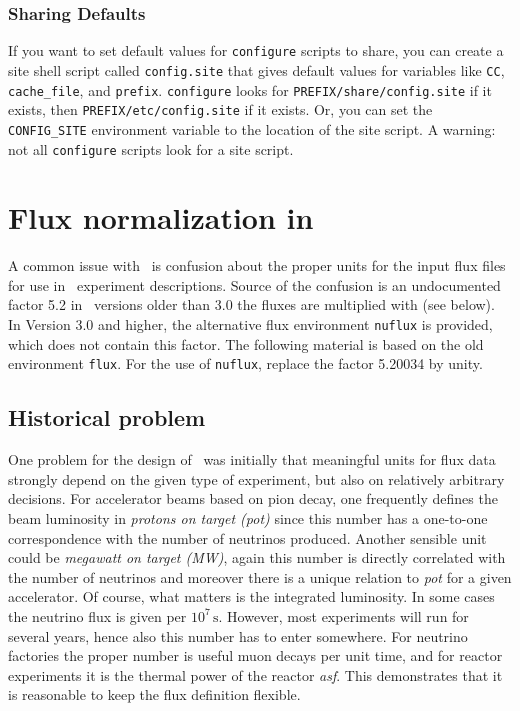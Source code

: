 \begin{appendix}
\subsection*{Sharing Defaults}
   If you want to set default values for \verb+configure+ scripts to share,
you can create a site shell script called \verb+config.site+ that gives
default values for variables like \verb+CC+,  \verb+cache_file+, and 
\verb+prefix+.
\verb+configure+ looks for \verb+PREFIX/share/config.site+ if it exists, then
\verb+PREFIX/etc/config.site+ if it exists.  Or, you can set the
\verb+CONFIG_SITE+ environment variable to the location of the site script.
A warning: not all \verb+configure+ scripts look for a site script.





\chapter{Flux normalization in \GLOBES }
\label{app:flux}

A common issue with \GLOBES\ is confusion about the proper units for
the input flux files for use in \AEDL\ experiment descriptions. Source of
the confusion is an undocumented factor 5.2 in \GLOBES\ versions older
than 3.0 the fluxes are multiplied with (see below). In Version 3.0 and 
higher, the alternative flux environment {\tt nuflux} is provided, 
which does not contain this factor. The following material is
based on the old environment {\tt flux}. For the use of {\tt nuflux},
replace the factor 5.20034 by unity.

\section*{Historical problem}

One problem for the design of \AEDL\ was initially that meaningful
units for flux data strongly depend on the given type of experiment,
but also on relatively arbitrary decisions. For accelerator beams
based on pion decay, one frequently defines the beam luminosity in
{\it protons on target (pot)} since this number has a one-to-one
correspondence with the number of neutrinos produced. Another sensible
unit could be {\it megawatt on target (MW)}, again this number is directly
correlated with the number of neutrinos and moreover there is a unique
relation to {\it pot} for a given accelerator. Of course,
what matters is the integrated luminosity. In some  cases the
neutrino flux is given per $10^7\,\mathrm{s}$. However,
most experiments will run for several years, hence also this number
has to enter somewhere. For neutrino factories the proper number is
useful muon decays per unit time, and for reactor experiments it is
the thermal power of the reactor {\it asf}. This demonstrates that it is
reasonable to keep the flux definition flexible.


\end{appendix}
